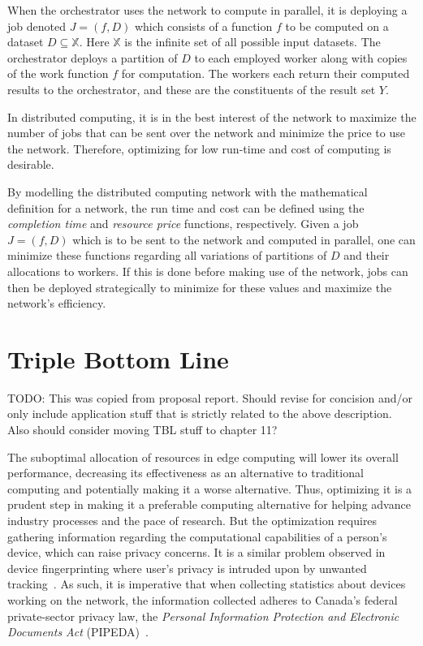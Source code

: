 \documentclass[../mthe-493-final-project.tex]{subfiles}
\begin{document}
    When the orchestrator uses the network to compute in parallel, it is deploying a job denoted $J = (f,D)$ which consists of a function $f$ to be computed on a dataset $D \subseteq \mathbb{X}$. Here $\mathbb{X}$ is the infinite set of all possible input datasets. The orchestrator deploys a partition of $D$ to each employed worker along with copies of the work function $f$ for computation. The workers each return their computed results to the orchestrator, and these are the constituents of the result set $Y$.

    In distributed computing, it is in the best interest of the network to maximize the number of jobs that can be sent over the network and minimize the price to use the network. Therefore, optimizing for low run-time and cost of computing is desirable.

    By modelling the distributed computing network with the mathematical definition for a network, the run time and cost can be defined using the \textit{completion time} and \textit{resource price} functions, respectively. Given a job $J = (f,D)$ which is to be sent to the network and computed in parallel, one can minimize these functions regarding all variations of partitions of $D$ and their allocations to workers. If this is done before making use of the network, jobs can then be deployed strategically to minimize for these values and maximize the network's efficiency.

    \section{Triple Bottom Line}

    TODO: This was copied from proposal report. Should revise for concision and/or only include application stuff that is strictly related to the above description. Also should consider moving TBL stuff to chapter 11?

    The suboptimal allocation of resources in edge computing will lower its overall performance, decreasing its effectiveness as an alternative to traditional computing and potentially making it a worse alternative. Thus, optimizing it is a prudent step in making it a preferable computing alternative for helping advance industry processes and the pace of research. But the optimization requires gathering information regarding the computational capabilities of a person's device, which can raise privacy concerns. It is a similar problem observed in device fingerprinting where user's privacy is intruded upon by unwanted tracking~\cite{laperdrix_browser_2020}. As such, it is imperative that when collecting statistics about devices working on the network, the information collected adheres to Canada’s federal private-sector privacy law, the \textit{Personal Information Protection and Electronic Documents Act} (PIPEDA)~\cite{noauthor_privacy_nodate}.
\end{document}
